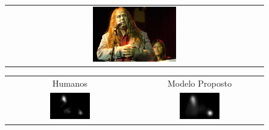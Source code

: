 \documentclass[10pt]{beamer}
\begin{document}
\begin{frame}{}
    \begin{figure}[hbt]
    \begin{center}
		\begin{tabular} {c}
		\includegraphics[width=0.33\textwidth]{./img/person_s.jpg}
		\end{tabular}
    \end{center}
    \end{figure}
    \begin{figure}[hbt]
    \begin{center}
		\begin{tabular} {cc}
        Humanos & Modelo Proposto\\
        \includegraphics[width=0.33\textwidth]{./img/person_gt.jpg} &
		\includegraphics[width=0.33\textwidth]{./img/person_m.jpg}
		\end{tabular}
    \end{center}
    \end{figure}
\end{frame}
\end{document}
